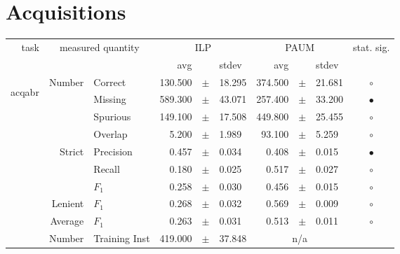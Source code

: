 \clearpage

\section{Acquisitions}


\begin{longtable}{|r|r|l||rcl|rcl|c|}
\hline
\multirow{2}{*}{task} & \multicolumn{2}{|c||}{\multirow{2}{*}{measured quantity}} & \multicolumn{3}{|c|}{ILP} & \multicolumn{3}{|c|}{PAUM} & \multirow{2}{*}{ stat. sig.}\\
\cline{4-9}
  & \multicolumn{2}{|c||}{} &  avg  &    &  stdev  &  avg  &    &  stdev  & \\
\hline
\endhead
\hline
\hline
\multirow{11}{*}{\begin{sideways}acqabr\end{sideways} }
             & \multirow{4}{*}{    Number} &         Correct &     130.500 &  $\pm$  &      18.295 &     374.500 &  $\pm$  &      21.681 & $\circ$ \\
\cline{3-10} &                             &         Missing &     589.300 &  $\pm$  &      43.071 &     257.400 &  $\pm$  &      33.200 & $\bullet$ \\
\cline{3-10} &                             &        Spurious &     149.100 &  $\pm$  &      17.508 &     449.800 &  $\pm$  &      25.455 & $\circ$ \\
\cline{3-10} &                             &         Overlap &       5.200 &  $\pm$  &       1.989 &      93.100 &  $\pm$  &       5.259 & $\circ$ \\
\cline{2-10} & \multirow{3}{*}{    Strict} &       Precision &       0.457 &  $\pm$  &       0.034 &       0.408 &  $\pm$  &       0.015 & $\bullet$ \\
\cline{3-10} &                             &          Recall &       0.180 &  $\pm$  &       0.025 &       0.517 &  $\pm$  &       0.027 & $\circ$ \\
\cline{3-10} &                             &           $F_1$ &       0.258 &  $\pm$  &       0.030 &       0.456 &  $\pm$  &       0.015 & $\circ$ \\
\cline{2-10} &                     Lenient &           $F_1$ &       0.268 &  $\pm$  &       0.032 &       0.569 &  $\pm$  &       0.009 & $\circ$ \\
\cline{2-10} &                     Average &           $F_1$ &       0.263 &  $\pm$  &       0.031 &       0.513 &  $\pm$  &       0.011 & $\circ$ \\
\cline{2-10} & \multirow{2}{*}{    Number} &   Training Inst &     419.000 &  $\pm$  &      37.848 &    \multicolumn{3}{c|}{n/a}         &  \\

\end{longtable}
